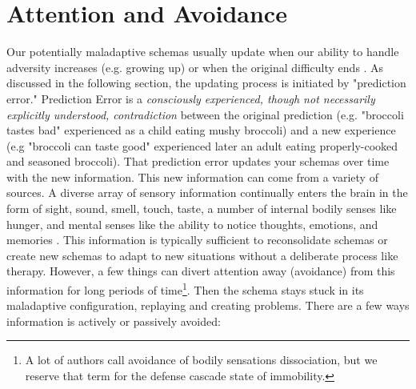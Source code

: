 \documentclass[12pt,letterpaper]{book}
\begin{document}
\section{Attention and Avoidance}
\label{attention}
Our potentially maladaptive schemas usually update when our ability to handle adversity increases (e.g. growing up) or when the original difficulty ends \cite{eckerUnlocking}. As discussed in the following section, the updating process is initiated by "prediction error." Prediction Error is a \textit{consciously experienced, though not necessarily explicitly understood, contradiction} between the original prediction (e.g. "broccoli tastes bad" experienced as a child eating mushy broccoli) and a new experience (e.g "broccoli can taste good" experienced later an adult eating properly-cooked and seasoned broccoli). That prediction error updates your schemas over time with the new information. This new information can come from a variety of sources. A diverse array of sensory information continually enters the brain in the form of sight, sound, smell, touch, taste, a number of internal bodily senses like hunger, and mental senses like the ability to notice thoughts, emotions, and memories \cite{berghSelfEvidencing}. This information is typically sufficient to reconsolidate schemas or create new schemas to adapt to new situations without a deliberate process like therapy. However, a few things can divert attention away (avoidance) from this information for long periods of time\footnote{A lot of authors call avoidance of bodily sensations dissociation, but we reserve that term for the defense cascade state of immobility.}. Then the schema stays stuck in its maladaptive configuration, replaying and creating problems. There are a few ways information is actively or passively avoided:
\end{document}
